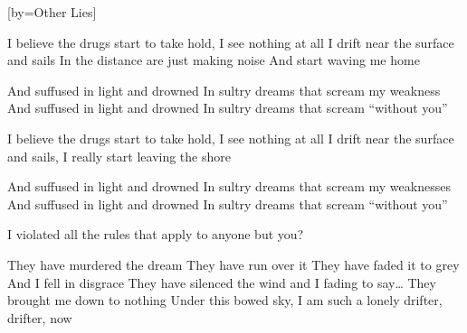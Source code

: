 [by={Other Lies}]

  \chordsoff


  \beginverse
  I believe the drugs start to take hold,
  I see nothing at all
  I drift near the surface and sails
  In the distance are just making noise
  And start waving me home
  \endverse

  \beginchorus
  And suffused in light and drowned
  In sultry dreams that scream my weakness
  And suffused in light and drowned
  In sultry dreams that scream “without you”
  \endchorus

  \beginverse
  I believe the drugs start to take hold,
  I see nothing at all
  I drift near the surface and sails,
  I really start leaving the shore
  \endverse

  \beginchorus
  And suffused in light and drowned
  In sultry dreams that scream my weaknesses
  And suffused in light and drowned
  In sultry dreams that scream “without you”
  \endchorus

  \beginverse
  I violated all the rules that apply to anyone but you? 
  \endverse

  \beginverse
  They have murdered the dream
  They have run over it
  They have faded it to grey
  And I fell in disgrace 
  They have silenced the wind
  and I fading to say… 
  They brought me down to nothing 
  Under this bowed sky,
  I am such a lonely drifter, drifter, now
  \endverse
\endsong
